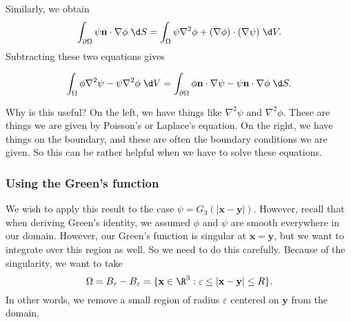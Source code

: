 \documentclass[a4paper]{article}
\begin{document}
Similarly, we obtain
\[
  \int_{\partial \Omega} \psi\mathbf{n} \cdot \nabla \phi\;\d S = \int_\Omega \psi \nabla^2 \phi + (\nabla \phi)\cdot (\nabla \psi)\;\d V.
\]
Subtracting these two equations gives
\begin{prop}
  \[
    \int_\Omega \phi \nabla^2 \psi - \psi \nabla^2 \phi \;\d V = \int_{\partial \Omega} \phi \mathbf{n}\cdot \nabla \psi - \psi \mathbf{n}\cdot \nabla \phi\;\d S.
  \]
\end{prop}
Why is this useful? On the left, we have things like $\nabla^2 \psi$ and $\nabla^2 \phi$. These are things we are given by Poisson's or Laplace's equation. On the right, we have things on the boundary, and these are often the boundary conditions we are given. So this can be rather helpful when we have to solve these equations.

\subsubsection*{Using the Green's function}
We wish to apply this result to the case $\psi = G_3(|\mathbf{x} - \mathbf{y}|)$. However, recall that when deriving Green's identity, we assumed $\phi$ and $\psi$ are smooth everywhere in our domain. However, our Green's function is singular at $\mathbf{x} = \mathbf{y}$, but we want to integrate over this region as well. So we need to do this carefully. Because of the singularity, we want to take
\[
  \Omega = B_r - B_\varepsilon = \{\mathbf{x}\in \R^3: \varepsilon \leq |\mathbf{x} - \mathbf{y}| \leq R\}.
\]
In other words, we remove a small region of radius $\varepsilon$ centered on $\mathbf{y}$ from the domain.
\end{document}
